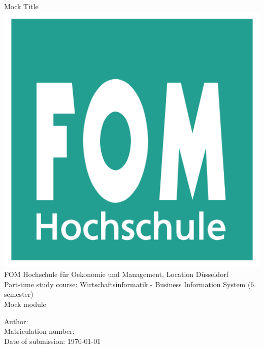 \begin{titlepage}
	\begin{center}
	\huge{Mock Title}\\[0.5cm]
	\includegraphics[width=0.3\linewidth]{./images/fom.png}\\[0.3cm]
	\large{FOM Hochschule für Oekonomie und Management, Location Düsseldorf}\\[2mm]
	\large{Part-time study course: Wirtschaftsinformatik - Business Information System (6. semester)}\\[2mm]
	\large{Mock module}\\
	\end{center}
	\vspace*{\fill}
	\large{Author: }\\
	\large{Matriculation number: }\\
	\large{Date of submission: \today}
\end{titlepage}
